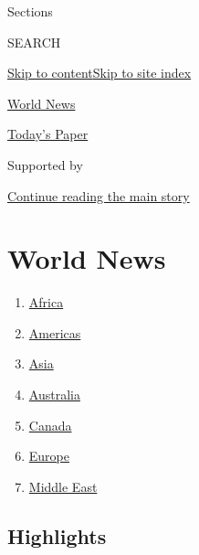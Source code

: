 Sections

SEARCH

\protect\hyperlink{site-content}{Skip to
content}\protect\hyperlink{site-index}{Skip to site index}

\href{https://www.nytimes.com/section/world}{World News}

\href{https://myaccount.nytimes.com/auth/login?response_type=cookie\&client_id=vi}{}

\href{https://www.nytimes.com/section/todayspaper}{Today's Paper}

Supported by

\protect\hyperlink{after-sponsor}{Continue reading the main story}

\hypertarget{world-news}{%
\section{World News}\label{world-news}}

\begin{enumerate}
\def\labelenumi{\arabic{enumi}.}
\tightlist
\item
  \href{/section/world/africa}{Africa}
\item
  \href{/section/world/americas}{Americas}
\item
  \href{/section/world/asia}{Asia}
\item
  \href{/section/world/australia}{Australia}
\item
  \href{/section/world/canada}{Canada}
\item
  \href{/section/world/europe}{Europe}
\item
  \href{/section/world/middleeast}{Middle East}
\end{enumerate}

\hypertarget{highlights}{%
\subsection{Highlights}\label{highlights}}

